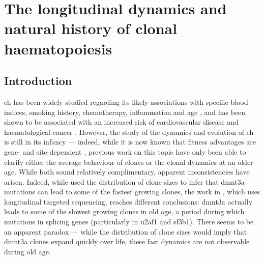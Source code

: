 \chapter{The longitudinal dynamics and natural history of clonal haematopoiesis}

\section{Introduction}

\ac{ch} has been widely studied regarding its likely associations with specific blood indices, smoking history, chemotherapy, inflammation and age \cite{Dawoud2020-af,Coombs2017-ph,McKerrell2015-rl,Cai2018-yi,Bolton2020-ct}, and has been shown to be associated with an increased risk of cardiovascular disease and haematological cancer \cite{Jaiswal2014-rl,Genovese2014-eu, Young2016-du, Xie2014-np, Desai2018-pj, Midic2020-zh, Zink2017-zi, Acuna-Hidalgo2017-ng}. However, the study of the dynamics and evolution of \ac{ch} is still in its infancy --- indeed, while it is now known that fitness advantages are gene- and site-dependent \cite{Watson2020-pz,Robertson2021-sw}, previous work on this topic have only been able to clarify either the average behaviour of clones or the clonal dynamics at an older age. While both sound relatively complimentary, apparent inconsistencies have arisen. Indeed, while \cite{Watson2020-pz} used the distribution of clone sizes to infer that \ac{dnmt3a} mutations can lead to some of the fastest growing clones, the work in \cite{Robertson2021-sw}, which uses longitudinal targeted sequencing, reaches different conclusions: \ac{dnmt3a} actually leads to some of the slowest growing clones in old age, a period during which mutations in splicing genes (particularly in \ac{u2af1} and \ac{sf3b1}). There seems to be an apparent paradox --- while the distribution of clone sizes would imply that \ac{dnmt3a} clones expand quickly over life, these fast dynamics are not observable during old age. 

